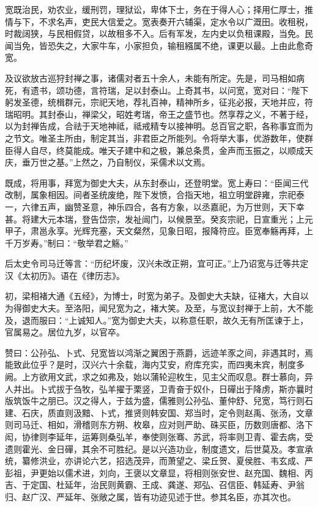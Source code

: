 \documentclass[12pt,UTF8]{ctexbook}
\begin{document}
宽既治民，劝农业，缓刑罚，理狱讼，卑体下士，务在于得人心；择用仁厚士，推情与下，不求名声，吏民大信爱之。宽表奏开六辅渠，定水令以广溉田。收租税，时裁阔狭，与民相假贷，以故租多不入。后有军发，左内史以负租课殿，当免。民闻当免，皆恐失之，大家牛车，小家担负，输租繦属不绝，课更以最。上由此愈奇宽。



及议欲放古巡狩封禅之事，诸儒对者五十余人，未能有所定。先是，司马相如病死，有遗书，颂功德，言符瑞，足以封泰山。上奇其书，以问宽，宽对曰：“陛下躬发圣德，统楫群元，宗祀天地，荐礼百神，精神所乡，征兆必报，天地并应，符瑞昭明。其封泰山，禅梁父，昭姓考瑞，帝王之盛节也。然享荐之义，不著于经，以为封禅告成，合祛于天地神祗，祗戒精专以接神明。总百官之职，各称事宜而为之节文。唯圣主所由，制定其当，非君臣之所能列。令将举大事，优游数年，使群臣得人自尽，终莫能成。唯天子建中和之极，兼总条贯，金声而玉振之，以顺成天庆，垂万世之基。”上然之，乃自制仪，采儒术以文焉。



既成，将用事，拜宽为御史大夫，从东封泰山，还登明堂。宽上寿曰：“臣闻三代改制，属象相因。间者圣统废绝，陛下发愤，合指天地，祖立明堂辟雍，宗祀泰一，六律五声，幽赞圣意，神乐四合，各有方象，以丞嘉祀，为万世则，天下幸甚。将建大元本瑞，登告岱宗，发祉闿门，以候景至。癸亥宗祀，日宣重光；上元甲子，肃邕永享。光辉充塞，天文粲然，见象日昭，报降符应。臣宽奉觞再拜，上千万岁寿。”制曰：“敬举君之觞。”



后太史令司马迁等言：“历纪坏废，汉兴未改正朔，宜可正。”上乃诏宽与迁等共定汉《太初历》。语在《律历志》。



初，梁相褚大通《五经》，为博士，时宽为弟子。及御史大夫缺，征褚大，大自以为得御史大夫。至洛阳，闻兒宽为之，褚大笑。及至，与宽议封禅于上前，大不能及，退而服曰：“上诚知人。”宽为御史大夫，以称意任职，故久无有所匡谏于上，官属易之。居位九岁，以官卒。



赞曰：公孙弘、卜式、兒宽皆以鸿渐之翼困于燕爵，远迹羊豕之间，非遇其时，焉能致此位乎？是时，汉兴六十余载，海内艾安，府库充实，而四夷未宾，制度多阙。上方欲用文武，求之如弗及，始以蒲轮迎枚生，见主父而叹息。群士慕向，异人并出。卜式拔于刍牧，弘羊擢于栗竖，卫青奋于奴仆，日磾出于降虏，斯亦曩时版筑饭牛之朋已。汉之得人，于兹为盛，儒雅则公孙弘、董仲舒、兒宽，笃行则石建、石庆，质直则汲黯、卜式，推贤则韩安国、郑当时，定令则赵禹、张汤，文章则司马迁、相如，滑稽则东方朔、枚皋，应对则严助、硃买臣，历数则唐都、洛下闳，协律则李延年，运筹则桑弘羊，奉使则张骞、苏武，将率则卫青、霍去病，受遗则霍光、金日磾，其余不可胜纪。是以兴造功业，制度遗文，后世莫及。孝宣承统，纂修洪业，亦讲论六艺，招选茂异，而萧望之、梁丘贺、夏侯胜、韦玄成、严彭祖，尹更始以儒术进，刘向，王褒以文章显，将相则张安世、赵充国、魏相、丙吉、于定国、杜延年，治民则黄霸、王成、龚遂、郑弘、召信臣、韩延寿、尹翁归、赵广汉、严延年、张敞之属，皆有功迹见述于世。参其名臣，亦其次也。
\end{document}

